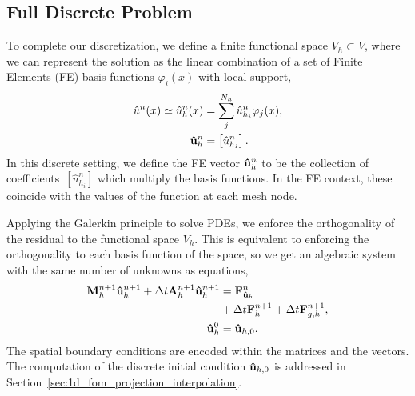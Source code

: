 \documentclass[../main.tex]{subfiles}
\begin{document}
\subsection{Full Discrete Problem}
To complete our discretization, we define a finite functional space $V_h \subset V$, where we can represent the solution as the linear combination of a set of Finite Elements (FE) basis functions $\varphi_i(x)$ with local support,
\begin{align}
    \hat{u}^{n}(x) \simeq \hat{u}_h^n(x) &= \sum_j^{N_h} \hat{u}_{h_i}^n \varphi_j(x), \\
    \vb{\hat{u}}_h^{n} &= \left[\hat{u}_{h_i}^n\right].
\end{align}
In this discrete setting, we define the FE vector $\vb{\hat{u}}_h^{n}$ to be the collection of coefficients~$[\hat{u}_{h_i}^n]$ which multiply the basis functions.
In the FE context, these coincide with the values of the function at each mesh node.

Applying the Galerkin principle to solve PDEs, we enforce the orthogonality of the residual to the functional space $V_h$. 
This is equivalent to enforcing the orthogonality to each basis function of the space, so we get an algebraic system with the same number of unknowns as equations, 
\begin{subequations}
    \begin{align}
        \label{eq:1d_fom_weak_formulation_discrete}
        \vb{M}^{n+1}_h \vb{\hat{u}}_{h}^{n+1} + \Delta t \vb{A}^{n+1}_h \vb{\hat{u}}_{h}^{n+1} &= \vb{F}^{n}_{\vb{\hat{u}}_h} \\
        &+ \Delta t \vb{F}_h^{n+1} + \Delta t \vb{F}^{n+1}_{g, h}, \nonumber \\
        \vb{\hat{u}}_h^{0} &= \vb{\hat{u}}_{h,0}.
    \end{align}
\end{subequations}
The spatial boundary conditions are encoded within the matrices and the vectors. 
The computation of the discrete initial condition $\vb{\hat{u}}_{h,0}$ is addressed in Section~\ref{sec:1d_fom_projection_interpolation}.
\end{document}
